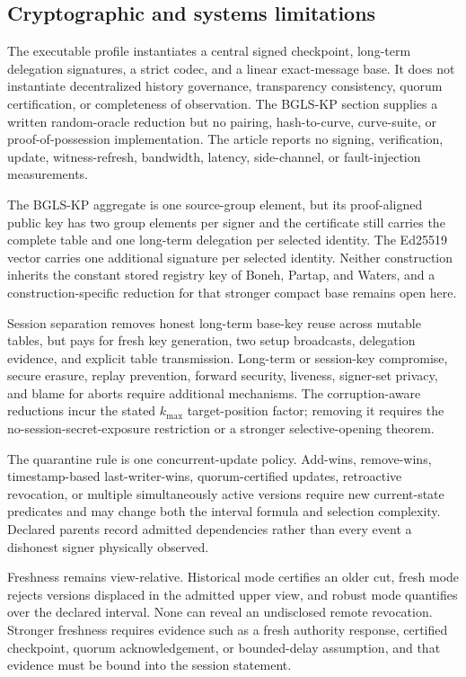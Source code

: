 \documentclass[11pt]{article}
\theoremstyle{definition}
\begin{document}
\subsection{Cryptographic and systems limitations}
The executable profile instantiates a central signed checkpoint, long-term delegation signatures, a strict codec, and a linear exact-message base.  It does not instantiate decentralized history governance, transparency consistency, quorum certification, or completeness of observation.  The BGLS-KP section supplies a written random-oracle reduction but no pairing, hash-to-curve, curve-suite, or proof-of-possession implementation.  The article reports no signing, verification, update, witness-refresh, bandwidth, latency, side-channel, or fault-injection measurements.

The BGLS-KP aggregate is one source-group element, but its proof-aligned public key has two group elements per signer and the certificate still carries the complete table and one long-term delegation per selected identity.  The Ed25519 vector carries one additional signature per selected identity.  Neither construction inherits the constant stored registry key of Boneh, Partap, and Waters, and a construction-specific reduction for that stronger compact base remains open here.

Session separation removes honest long-term base-key reuse across mutable tables, but pays for fresh key generation, two setup broadcasts, delegation evidence, and explicit table transmission.  Long-term or session-key compromise, secure erasure, replay prevention, forward security, liveness, signer-set privacy, and blame for aborts require additional mechanisms.  The corruption-aware reductions incur the stated $k_{\max}$ target-position factor; removing it requires the no-session-secret-exposure restriction or a stronger selective-opening theorem.

The quarantine rule is one concurrent-update policy.  Add-wins, remove-wins, timestamp-based last-writer-wins, quorum-certified updates, retroactive revocation, or multiple simultaneously active versions require new current-state predicates and may change both the interval formula and selection complexity.  Declared parents record admitted dependencies rather than every event a dishonest signer physically observed.

Freshness remains view-relative.  Historical mode certifies an older cut, fresh mode rejects versions displaced in the admitted upper view, and robust mode quantifies over the declared interval.  None can reveal an undisclosed remote revocation.  Stronger freshness requires evidence such as a fresh authority response, certified checkpoint, quorum acknowledgement, or bounded-delay assumption, and that evidence must be bound into the session statement.
\end{document}
